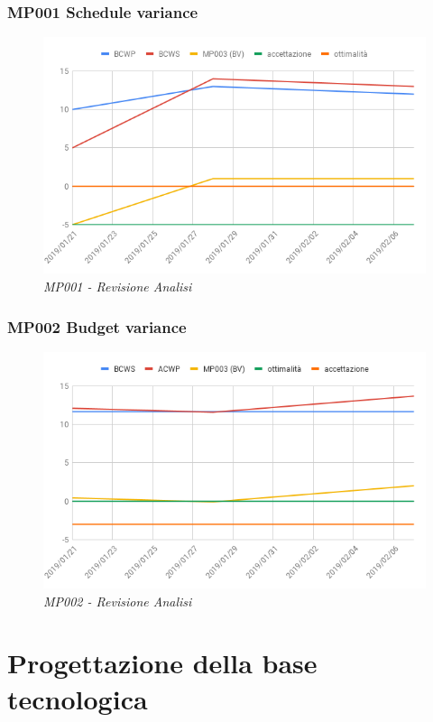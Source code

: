 \subsubsection{MP001 Schedule variance}
\begin{figure} [h]
    \centering
	\includegraphics[scale=0.5]{./images/svRa.png}
	\caption{\textit{MP001 - Revisione Analisi}}\label{}
\end{figure}
\pagebreak
\subsubsection{MP002 Budget variance}
\begin{figure} [h]
    \centering
	\includegraphics[scale=0.5]{./images/bvRa.png}
	\caption{\textit{MP002 - Revisione Analisi}}\label{}
\end{figure}

\section{Progettazione della base tecnologica}
\label{progettazione}
